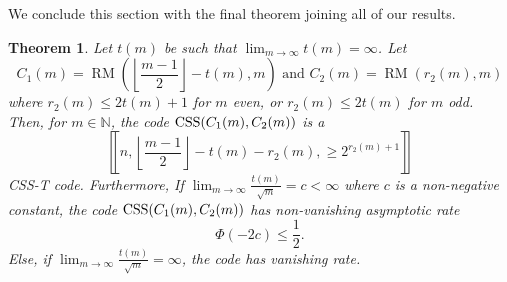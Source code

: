 \documentclass{amsart}
\newtheorem{theorem}{Theorem}
\theoremstyle{definition}
\newcommand{\N}{{\mathbb{N}}}
\newcommand{\floor}[1]{\left\lfloor#1\right\rfloor}
\newcommand{\CSS}{\textnormal{CSS}}
\DeclareMathOperator{\RM}{RM}
\begin{document}
We conclude this section with the final theorem joining all of our results.

\begin{theorem}\label{t:css-t-family}  
Let $t(m)$ be such that $\lim_{m\to \infty} t(m)=\infty$. Let   \[C_1(m)=\RM\left(\floor{\frac{m-1}{2}} - t(m), m\right) \mbox{ and }  C_2(m)=\RM(r_2(m),m)\] where $r_2(m)\leq 2t(m)+1$ for $m$ even, or 
$r_2(m)\leq 2t(m)$ for $m$ odd. Then, for $m\in \N$, the code $\CSS(C_1(m),C_2(m))$ is a \[\left\llbracket n, \floor{\frac{m-1}{2}} - t(m) - r_2(m), \geq 2^{r_2(m)+1}\right\rrbracket\] CSS-T code.  Furthermore, If $\lim_{m\to \infty} \frac{t(m)}{\sqrt{m}}=c<\infty$ where $c$ is a non-negative constant, the code $\CSS(C_1(m),C_2(m))$ has non-vanishing asymptotic rate \[\Phi(-2c)\leq \frac{1}2.\] Else, if  $\lim_{m\to \infty} \frac{t(m)}{\sqrt{m}}=\infty$, the code has vanishing rate.

\end{theorem}
\end{document}
